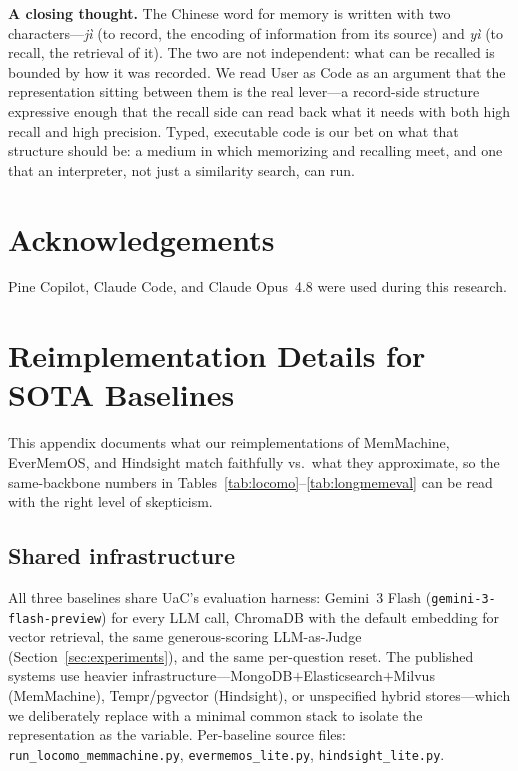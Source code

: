 \textbf{A closing thought.} The Chinese word for memory is written with two characters---\emph{j\`i} (to record, the encoding of information from its source) and \emph{y\`i} (to recall, the retrieval of it). The two are not independent: what can be recalled is bounded by how it was recorded. We read User as Code as an argument that the representation sitting between them is the real lever---a record-side structure expressive enough that the recall side can read back what it needs with both high recall and high precision. Typed, executable code is our bet on what that structure should be: a medium in which memorizing and recalling meet, and one that an interpreter, not just a similarity search, can run.

\section*{Acknowledgements}

Pine Copilot, Claude Code, and Claude Opus~4.8 were used during this research.


\appendix

\section{Reimplementation Details for SOTA Baselines}
\label{app:reimpl}

This appendix documents what our reimplementations of MemMachine, EverMemOS, and Hindsight match faithfully vs.\ what they approximate, so the same-backbone numbers in Tables~\ref{tab:locomo}--\ref{tab:longmemeval} can be read with the right level of skepticism.

\subsection{Shared infrastructure}

All three baselines share UaC's evaluation harness: Gemini~3 Flash (\texttt{gemini-3-flash-\allowbreak preview}) for every LLM call, ChromaDB with the default embedding for vector retrieval, the same generous-scoring LLM-as-Judge (Section~\ref{sec:experiments}), and the same per-question reset. The published systems use heavier infrastructure---MongoDB$+$Elasticsearch$+$Milvus (MemMachine), Tempr/pgvector (Hindsight), or unspecified hybrid stores---which we deliberately replace with a minimal common stack to isolate the representation as the variable. Per-baseline source files: \texttt{run\_locomo\_memmachine.py}, \texttt{evermemos\_lite.py}, \texttt{hindsight\_lite.py}.

